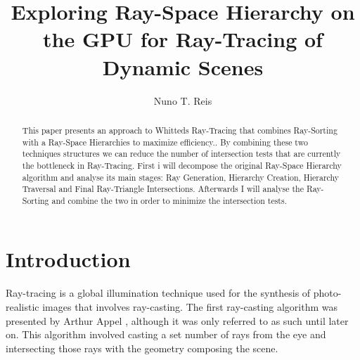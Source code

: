 \documentclass{llncs}
\begin{document}
%

%
\mainmatter              %
%

%
\title{Exploring Ray-Space Hierarchy on the GPU for Ray-Tracing of Dynamic Scenes}
%
%

%
\author{Nuno T. Reis}
%
%
%

%
%

\maketitle              %

\begin{abstract}

This paper presents an approach to Whitteds Ray-Tracing that combines Ray-Sorting with a Ray-Space Hierarchies to maximize efficiency.. 
By combining these two techniques structures we can reduce the number of intersection tests that are currently the bottleneck in Ray-Tracing. 
First i will decompose the original Ray-Space Hierarchy algorithm and analyse its main stages: Ray Generation,  Hierarchy Creation, Hierarchy Traversal and Final Ray-Triangle Intersections. Afterwards I will analyse the Ray-Sorting and combine the two in order to minimize the intersection tests.


\end{abstract}

%
\section{Introduction}
%

Ray-tracing is a global illumination technique used for the synthesis of photo-realistic images that involves ray-casting.
The first ray-casting algorithm was presented by Arthur Appel \cite{Appel68}, although it was only referred to as such until later on. 
This algorithm involved casting a set number of rays from the eye and intersecting those rays with the geometry composing the scene. 
\end{document}
